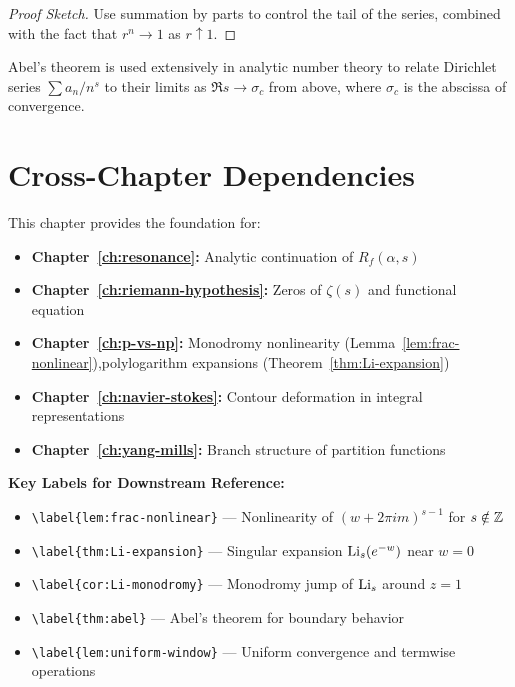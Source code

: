 \begin{proof}[Proof Sketch]
Use summation by parts to control the tail of the series, combined with the fact that $r^n \to 1$ as $r \uparrow 1$.
\end{proof}

\begin{remark}
Abel's theorem is used extensively in analytic number theory to relate Dirichlet series $\sum a_n / n^s$ to their limits as $\Re s \to \sigma_c$ from above, where $\sigma_c$ is the abscissa of convergence.
\end{remark}

\section{Cross-Chapter Dependencies}
\label{sec:dependencies}

This chapter provides the foundation for:

\begin{itemize}
\item \textbf{Chapter~\ref{ch:resonance}:} Analytic continuation of $R_f(\alpha, s)$
\item \textbf{Chapter~\ref{ch:riemann-hypothesis}:} Zeros of $\zeta(s)$ and functional equation
\item \textbf{Chapter~\ref{ch:p-vs-np}:} Monodromy nonlinearity (Lemma~\ref{lem:frac-nonlinear}),\linebreak[1] polylogarithm expansions (Theorem~\ref{thm:Li-expansion})
\item \textbf{Chapter~\ref{ch:navier-stokes}:} Contour deformation in integral representations
\item \textbf{Chapter~\ref{ch:yang-mills}:} Branch structure of partition functions
\end{itemize}

\textbf{Key Labels for Downstream Reference:}
\begin{itemize}
\item \verb|\label{lem:frac-nonlinear}| — Nonlinearity of $(w + 2\pi i m)^{s-1}$ for $s \notin \mathbb{Z}$
\item \verb|\label{thm:Li-expansion}| — Singular expansion $\operatorname{Li}_s(e^{-w})$ near $w = 0$
\item \verb|\label{cor:Li-monodromy}| — Monodromy jump of $\operatorname{Li}_s$ around $z = 1$
\item \verb|\label{thm:abel}| — Abel's theorem for boundary behavior
\item \verb|\label{lem:uniform-window}| — Uniform convergence and termwise operations
\end{itemize}

